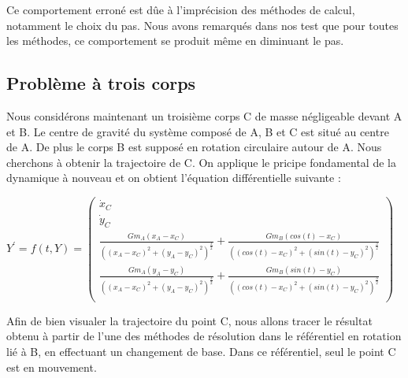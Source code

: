 Ce comportement erroné est dûe à l'imprécision des méthodes de calcul, notamment le choix du pas. Nous avons remarqués dans nos test que pour toutes les méthodes, ce comportement se produit même en diminuant le pas.
\subsection{Problème à trois corps}
Nous considérons maintenant un troisième corps C de masse négligeable devant A et B. Le centre de gravité du système composé de A, B et C est situé au centre de A. De plus le corps B est supposé en rotation circulaire autour de A. Nous cherchons à obtenir la trajectoire de C.
On applique le pricipe fondamental de la dynamique à nouveau et on obtient l'équation différentielle suivante :
\begin{center}
$Y^{'} = f(t,Y) = \begin{pmatrix}
  \dot x_{C} \\
  \dot y_{C} \\
   \frac{Gm_{A}(x_{A} - x_{C})}{((x_{A} - x_{C})^{2} + (y_{A} - y_{C})^{2})^{\frac{3}{2}}} + \frac{Gm_{B}(cos(t) - x_{C})}{((cos(t) - x_{C})^{2} + (sin(t) - y_{C})^{2})^{\frac{3}{2}}}\\
   \frac{Gm_{A}(y_{A} - y_{C})}{((x_{A} - x_{C})^{2} + (y_{A} - y_{C})^{2})^{\frac{3}{2}}} + \frac{Gm_{B}(sin(t) - y_{C})}{((cos(t) - x_{C})^{2} + (sin(t) - y_{C})^{2})^{\frac{3}{2}}}\\
\end{pmatrix}$
\end{center}

Afin de bien visualer la trajectoire du point C, nous allons tracer le résultat obtenu à partir de l'une des méthodes de résolution dans le référentiel en rotation lié à B, en effectuant un changement de base. Dans ce référentiel, seul le point C est en mouvement.

